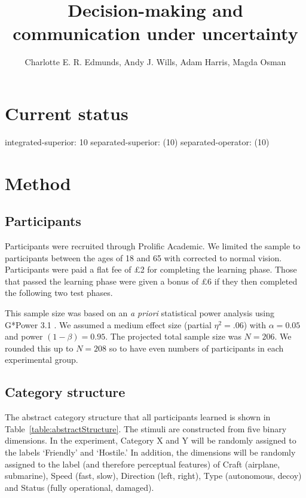 \documentclass[doc, a4paper, apacite]{apa6}
\title{Decision-making and communication under uncertainty}
\author{Charlotte E. R. Edmunds, Andy J. Wills, Adam Harris, Magda Osman}
\affiliation{Queen Mary, UCL, University of London \\ 11 January 2021}
\begin{document}
\maketitle
	\doublespacing
	
\section{Current status}

integrated-superior: 10
separated-superior: (10)
separated-operator: (10)


\section{Method}

\subsection{Participants}
Participants were recruited through Prolific Academic.
We limited the sample to participants between the ages of 18 and 65 with corrected to normal vision. 
Participants were paid a flat fee of \pounds 2 for completing the learning phase.
Those that passed the learning phase were given a bonus of \pounds 6 if they then completed the following two test phases. 

This sample size was based on an \emph{a priori} statistical power analysis using G*Power 3.1 \cite{GPower2007, GPower2009}. 
We assumed a medium effect size (partial $\eta^2 = .06$) with $\alpha=0.05$ and power $(1-\beta)= 0.95$.
The projected total sample size was $N=206$.
We rounded this up to $N=208$ so to have even numbers of participants in each experimental group. 

\subsection{Category structure}
The abstract category structure that all participants learned is shown in Table~\ref{table:abstractStructure}. 
The stimuli are constructed from five binary dimensions. 
In the experiment, Category X and Y will be randomly assigned to the labels `Friendly' and `Hostile.' 
In addition, the dimensions will be randomly assigned to the label (and therefore perceptual features) of Craft (airplane, submarine), Speed (fast, slow), Direction (left, right), Type (autonomous, decoy) and Status (fully operational, damaged). 
\end{document}
